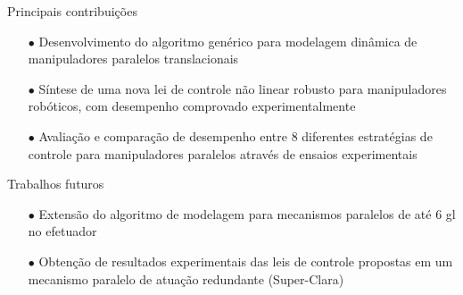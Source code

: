\documentclass[25pt,landscape]{beamer}
\begin{document}
\begin{frame}{Principais contribuições}
    \begin{block}{}
        \begin{itemize}
            \item[$\bullet$] Desenvolvimento do algoritmo genérico para modelagem dinâmica de manipuladores paralelos translacionais \\[8pt]
            \item[$\bullet$] Síntese de uma nova lei de controle não linear robusto para manipuladores robóticos, com desempenho comprovado experimentalmente \\[8pt]
            \item[$\bullet$] Avaliação e comparação de desempenho entre 8 diferentes estratégias de controle para manipuladores paralelos através de ensaios experimentais \\[8pt]
        \end{itemize}
    \end{block}
\end{frame}

\begin{frame}{Trabalhos futuros}
    \begin{block}{}
        \begin{itemize}
            \item[$\bullet$] Extensão do algoritmo de modelagem para mecanismos paralelos de até 6 gl no efetuador \\[8pt]
            \item[$\bullet$] Obtenção de resultados experimentais das leis de controle propostas em um mecanismo paralelo de atuação redundante (Super-Clara) \\[8pt]
        \end{itemize}
    \end{block}
\end{frame}
\end{document}
